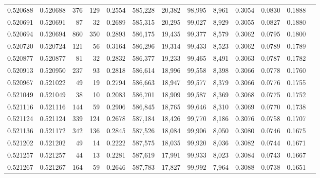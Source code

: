 \begin{tabular}{rrrrrrrrrrrrr}
0.520688 & 0.520688 &   376 &   129 &                                     0.2554 & 585,228 &  20,382 &  98,995 &   8,961 & 0.3054 & 0.0830 & 0.1888 \\
0.520691 & 0.520691 &    87 &    32 &                                     0.2689 & 585,315 &  20,295 &  99,027 &   8,929 & 0.3055 & 0.0827 & 0.1880 \\
0.520694 & 0.520694 &   860 &   350 &                                     0.2893 & 586,175 &  19,435 &  99,377 &   8,579 & 0.3062 & 0.0795 & 0.1800 \\
0.520720 & 0.520724 &   121 &    56 &                                     0.3164 & 586,296 &  19,314 &  99,433 &   8,523 & 0.3062 & 0.0789 & 0.1789 \\
0.520877 & 0.520877 &    81 &    32 &                                     0.2832 & 586,377 &  19,233 &  99,465 &   8,491 & 0.3063 & 0.0787 & 0.1782 \\
0.520913 & 0.520950 &   237 &    93 &                                     0.2818 & 586,614 &  18,996 &  99,558 &   8,398 & 0.3066 & 0.0778 & 0.1760 \\
0.520967 & 0.521022 &    49 &    19 &                                     0.2794 & 586,663 &  18,947 &  99,577 &   8,379 & 0.3066 & 0.0776 & 0.1755 \\
0.521049 & 0.521049 &    38 &    10 &                                     0.2083 & 586,701 &  18,909 &  99,587 &   8,369 & 0.3068 & 0.0775 & 0.1752 \\
0.521116 & 0.521116 &   144 &    59 &                                     0.2906 & 586,845 &  18,765 &  99,646 &   8,310 & 0.3069 & 0.0770 & 0.1738 \\
0.521124 & 0.521124 &   339 &   124 &                                     0.2678 & 587,184 &  18,426 &  99,770 &   8,186 & 0.3076 & 0.0758 & 0.1707 \\
0.521136 & 0.521172 &   342 &   136 &                                     0.2845 & 587,526 &  18,084 &  99,906 &   8,050 & 0.3080 & 0.0746 & 0.1675 \\
0.521202 & 0.521202 &    49 &    14 &                                     0.2222 & 587,575 &  18,035 &  99,920 &   8,036 & 0.3082 & 0.0744 & 0.1671 \\
0.521257 & 0.521257 &    44 &    13 &                                     0.2281 & 587,619 &  17,991 &  99,933 &   8,023 & 0.3084 & 0.0743 & 0.1667 \\
0.521267 & 0.521267 &   164 &    59 &                                     0.2646 & 587,783 &  17,827 &  99,992 &   7,964 & 0.3088 & 0.0738 & 0.1651 \\

\end{tabular}
